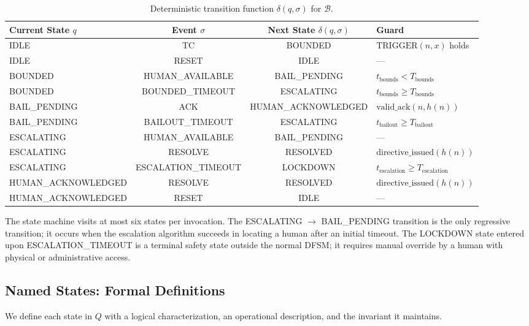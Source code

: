 \begin{table}[htbp]
\centering
\caption{Deterministic transition function $\delta(q, \sigma)$ for $\mathcal{B}$.}
\label{tab:delta}
\begin{tabular}{lccl}
\toprule
\textbf{Current State $q$} & \textbf{Event $\sigma$} & \textbf{Next State $\delta(q,\sigma)$} & \textbf{Guard} \\ \midrule
IDLE & TC & BOUNDED & $\text{TRIGGER}(n, x)$ holds \\
IDLE & RESET & IDLE & — \\
BOUNDED & HUMAN\_AVAILABLE & BAIL\_PENDING & $t_{\text{bounds}} < T_{\text{bounds}}$ \\
BOUNDED & BOUNDED\_TIMEOUT & ESCALATING & $t_{\text{bounds}} \geq T_{\text{bounds}}$ \\
BAIL\_PENDING & ACK & HUMAN\_ACKNOWLEDGED & $\text{valid\_ack}(n, h(n))$ \\
BAIL\_PENDING & BAILOUT\_TIMEOUT & ESCALATING & $t_{\text{bailout}} \geq T_{\text{bailout}}$ \\
ESCALATING & HUMAN\_AVAILABLE & BAIL\_PENDING & — \\
ESCALATING & RESOLVE & RESOLVED & $\text{directive\_issued}(h(n))$ \\
ESCALATING & ESCALATION\_TIMEOUT & LOCKDOWN & $t_{\text{escalation}} \geq T_{\text{escalation}}$ \\
HUMAN\_ACKNOWLEDGED & RESOLVE & RESOLVED & $\text{directive\_issued}(h(n))$ \\
HUMAN\_ACKNOWLEDGED & RESET & IDLE & — \\ \bottomrule
\end{tabular}
\end{table}

The state machine visits at most six states per invocation. The ESCALATING $\rightarrow$ BAIL\_PENDING transition is the only regressive transition; it occurs when the escalation algorithm succeeds in locating a human after an initial timeout. The LOCKDOWN state entered upon ESCALATION\_TIMEOUT is a terminal safety state outside the normal DFSM; it requires manual override by a human with physical or administrative access.

\subsection{Named States: Formal Definitions}

We define each state in $Q$ with a logical characterization, an operational description, and the invariant it maintains.

